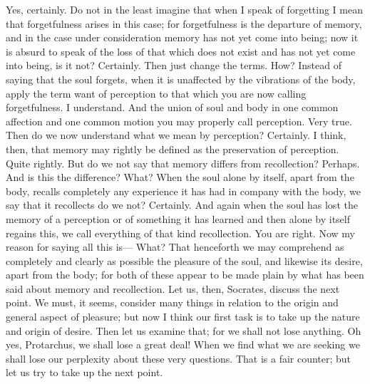\documentclass[letterpaper,12pt]{article}
\newcommand{\stephpag}[1]{\marginnote{\small\itshape\fontfamily{ppl}\selectfont #1}}
\begin{document}
\begin{drama}
\protarchusspeaks
Yes, certainly.
\socratesspeaks
Do not in the least imagine that when I speak of forgetting I mean that forgetfulness arises in this case; for forgetfulness is the departure of memory, and in the case under consideration memory has not yet come into being; now it is absurd to speak of the loss of that which does not exist and has not yet come into being, is it not?
\protarchusspeaks
Certainly.
\socratesspeaks
Then just change the terms.
\protarchusspeaks
How?
\socratesspeaks
Instead of saying that the soul forgets, when it is unaffected by the vibrations of the body, \stephpag{34 a} apply the term want of perception to that which you are now calling forgetfulness.
\protarchusspeaks
I understand.
\socratesspeaks
And the union of soul and body in one common affection and one common motion you may properly call perception.
\protarchusspeaks
Very true.
\socratesspeaks
Then do we now understand what we mean by perception?
\protarchusspeaks
Certainly.
\socratesspeaks
I think, then, that memory may rightly be defined as the preservation of perception. \stephpag{b}
\protarchusspeaks
Quite rightly.
\socratesspeaks
But do we not say that memory differs from recollection?
\protarchusspeaks
Perhaps.
\socratesspeaks
And is this the difference?
\protarchusspeaks
What?
\socratesspeaks
When the soul alone by itself, apart from the body, recalls completely any experience it has had in company with the body, we say that it recollects do we not?
\protarchusspeaks
Certainly.
\socratesspeaks
And again when the soul has lost the memory of a perception or of something it has learned and then alone by itself regains this, \stephpag{c} we call everything of that kind recollection.
\protarchusspeaks
You are right.
\socratesspeaks
Now my reason for saying all this is---
\protarchusspeaks
What?
\socratesspeaks
That henceforth we may comprehend as completely and clearly as possible the pleasure of the soul, and likewise its desire, apart from the body; for both of these appear to be made plain by what has been said about memory and recollection.
\protarchusspeaks
Let us, then, Socrates, discuss the next point.
\socratesspeaks
We must, it seems, consider many things in relation to the origin and general aspect of pleasure; \stephpag{d} but now I think our first task is to take up the nature and origin of desire.
\protarchusspeaks
Then let us examine that; for we shall not lose anything.
\socratesspeaks
Oh yes, Protarchus, we shall lose a great deal! When we find what we are seeking we shall lose our perplexity about these very questions.
\protarchusspeaks
That is a fair counter; but let us try to take up the next point.

\end{drama}
\end{document}

